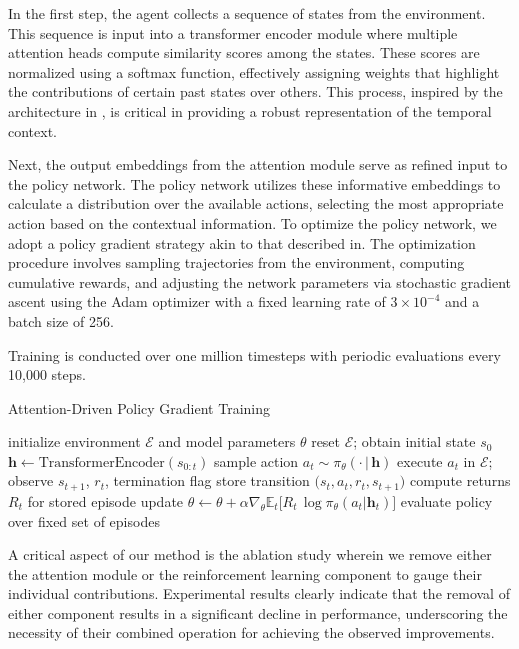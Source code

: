 \documentclass{article}
\begin{document}
In the first step, the agent collects a sequence of states from the environment. This sequence is input into a transformer encoder module where multiple attention heads compute similarity scores among the states. These scores are normalized using a softmax function, effectively assigning weights that highlight the contributions of certain past states over others. This process, inspired by the architecture in \cite{ashish_2017_attention}, is critical in providing a robust representation of the temporal context.

Next, the output embeddings from the attention module serve as refined input to the policy network. The policy network utilizes these informative embeddings to calculate a distribution over the available actions, selecting the most appropriate action based on the contextual information. To optimize the policy network, we adopt a policy gradient strategy akin to that described in. The optimization procedure involves sampling trajectories from the environment, computing cumulative rewards, and adjusting the network parameters via stochastic gradient ascent using the Adam optimizer with a fixed learning rate of $3\times10^{-4}$ and a batch size of 256.

Training is conducted over one million timesteps with periodic evaluations every 10,000 steps.

\begin{algorithm}[H]
\caption{Attention-Driven Policy Gradient Training}
\begin{algorithmic}[1]
\State initialize environment $\mathcal{E}$ and model parameters $\theta$
    \State reset $\mathcal{E}$; obtain initial state $s_0$
        \State $\mathbf{h} \leftarrow \text{TransformerEncoder}(s_{0:t})$ 
        \State sample action $a_t \sim \pi_\theta(\cdot\,|\,\mathbf{h})$
        \State execute $a_t$ in $\mathcal{E}$; observe $s_{t+1}$, $r_t$, termination flag
        \State store transition $\bigl(s_t,a_t,r_t,s_{t+1}\bigr)$
    \EndWhile
    \State compute returns $R_t$ for stored episode
    \State update $\theta \leftarrow \theta + \alpha \nabla_\theta \mathbb{E}_{t}\bigl[R_t\,\log\pi_\theta(a_t|\mathbf{h}_t)\bigr]$ 
        \State evaluate policy over fixed set of episodes
    \EndIf
\EndFor
\end{algorithmic}
\end{algorithm}

A critical aspect of our method is the ablation study wherein we remove either the attention module or the reinforcement learning component to gauge their individual contributions. Experimental results clearly indicate that the removal of either component results in a significant decline in performance, underscoring the necessity of their combined operation for achieving the observed improvements.
\end{document}
